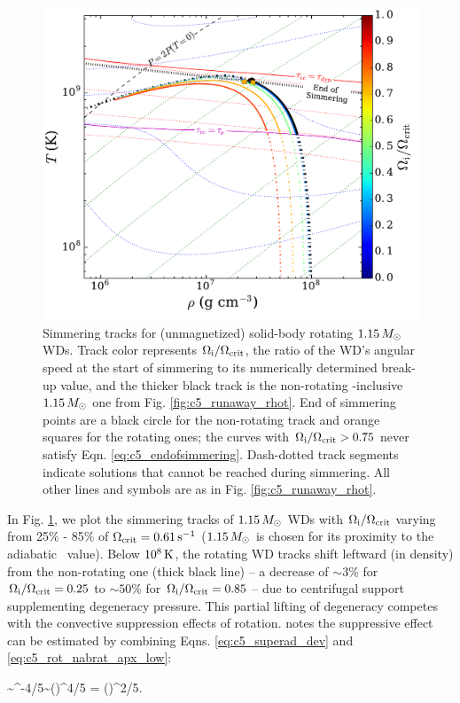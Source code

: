 \begin{figure}
\centering
\includegraphics[angle=0,width=0.8\columnwidth]{chapter5_zhu+16/figures/rot_stev_1pt15_rhot.pdf}
\caption{Simmering tracks for (unmagnetized) solid-body rotating $1.15\,\Msun$ WDs.  Track color represents $\Ominit/\Omcrit$, the ratio of the WD's angular speed at the start of simmering to its numerically determined break-up value, and the thicker black track is the non-rotating \dnabconv-inclusive $1.15\,\Msun$ one from Fig. \ref{fig:c5_runaway_rhot}.  End of simmering points are a black circle for the non-rotating track and orange squares for the rotating ones; the curves with $\Ominit/\Omcrit > 0.75$ never satisfy Eqn. \ref{eq:c5_endofsimmering}.  Dash-dotted track segments indicate solutions that cannot be reached during simmering.  All other lines and symbols are as in Fig. \ref{fig:c5_runaway_rhot}.}
\label{fig:c5_rot_stev_1pt15_rhot}
\end{figure}


In Fig. \ref{fig:c5_rot_stev_1pt15_rhot}, we plot the simmering tracks of $1.15\,\Msun$ WDs with $\Ominit/\Omcrit$ varying from 25\% - 85\% of $\Omcrit = 0.61\,\mrm{s}^{-1}$ ($1.15\,\Msun$ is chosen for its proximity to the adiabatic \Mcrit\ value).  Below $10^{8}\,\mathrm{K}$, the rotating WD tracks shift leftward (in density) from the non-rotating one (thick black line) -- a decrease of $\sim3$\% for $\Ominit/\Omcrit = 0.25$ to $\sim50$\% for $\Ominit/\Omcrit = 0.85$ -- due to centrifugal support supplementing degeneracy pressure.  This partial lifting of degeneracy competes with the convective suppression effects of rotation.  \citeal{stev79} notes the suppressive effect can be estimated by combining Eqns. \ref{eq:c5_superad_dev} and \ref{eq:c5_rot_nabrat_apx_low}: {\charles

\eqbegin
\dnabrot \sim \rossby^{-4/5}\dnabconvzero \sim \left(\right)^{4/5} = \left(\right)^{2/5}.
\label{eq:c5_rot_limitapprox}
\eqend}

